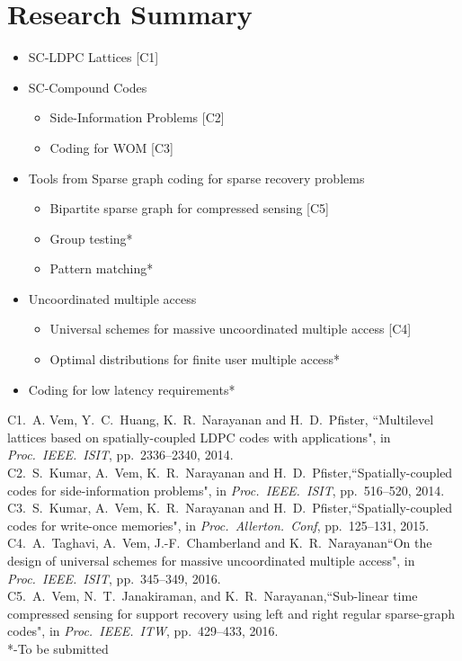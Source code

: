 \documentclass[10pt,presentation]{beamer}
\begin{document}
\section{Research Summary}
\begin{frame}
\begin{itemize}
\item SC-LDPC Lattices [C1]
\item SC-Compound Codes
\begin{itemize}
\item Side-Information Problems [C2]
\item Coding for WOM [C3] 
\end{itemize}
\item Tools from Sparse graph coding for sparse recovery problems 
\begin{itemize}
\item Bipartite sparse graph for compressed sensing [C5]
\item Group testing*
\item Pattern matching*
\end{itemize}
\item Uncoordinated multiple access
\begin{itemize}
\item Universal schemes for massive uncoordinated multiple access [C4]
\item Optimal distributions for finite user multiple access*
\end{itemize}	
\item Coding for low latency requirements*
\end{itemize}
\vspace{2mm}
{\tiny
C1.~A. Vem, Y.~C.~Huang, K.~R.~Narayanan and H.~D.~Pfister, ``Multilevel lattices based on spatially-coupled LDPC codes with applications", in \textit{Proc.~IEEE.~ISIT}, pp.~2336--2340, 2014.\\
C2.~S.~Kumar, A.~Vem, K.~R.~Narayanan and H.~D.~Pfister,``Spatially-coupled codes for side-information problems",
in \textit{Proc.~IEEE.~ISIT}, pp.~516--520, 2014.\\
C3.~S.~Kumar, A.~Vem, K.~R.~Narayanan and H.~D.~Pfister,``Spatially-coupled codes for write-once memories",
in \textit{Proc.~Allerton.~Conf}, pp.~125--131, 2015.\\
C4.~A.~Taghavi, A.~Vem, J.-F.~Chamberland and K.~R.~Narayanan``On the design of universal schemes for massive uncoordinated multiple access", in \textit{Proc.~IEEE.~ISIT}, pp.~345--349, 2016. \\
C5.~A.~Vem, N.~T.~Janakiraman, and K.~R.~Narayanan,``Sub-linear time compressed sensing for support recovery using left and right regular sparse-graph codes", in \textit{Proc.~IEEE.~ITW}, pp.~429--433, 2016.\\
*-To be submitted
}
\end{frame}
\end{document}
